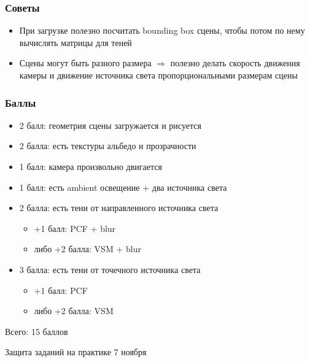 \documentclass{beamer}
\begin{document}
\begin{frame}[fragile]
\frametitle{Советы}
\begin{itemize}
\item При загрузке полезно посчитать bounding box сцены, чтобы потом по нему вычислять матрицы для теней
\item Сцены могут быть разного размера \begin{math}\Rightarrow\end{math} полезно делать скорость движения камеры и движение источника света пропорциональными размерам сцены
\end{itemize}
\end{frame}

\begin{frame}[fragile]
\frametitle{Баллы}
\begin{itemize}
\item 2 балл: геометрия сцены загружается и рисуется
\item 2 балла: есть текстуры альбедо и прозрачности
\item 1 балл: камера произвольно двигается
\item 1 балл: есть ambient освещение + два источника света
\item 2 балла: есть тени от направленного источника света
\begin{itemize}
\item +1 балл: PCF + blur
\item либо +2 балла: VSM + blur
\end{itemize}
\item 3 балла: есть тени от точечного источника света
\begin{itemize}
\item +1 балл: PCF
\item либо +2 балла: VSM
\end{itemize}
\end{itemize}
Всего: 15 баллов

Защита заданий на практике 7 ноября
\end{frame}
\end{document}
